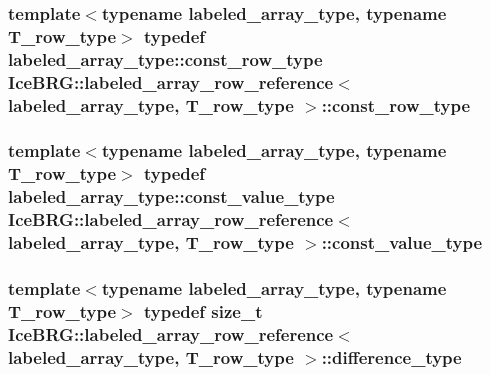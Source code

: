\subsubsection[{const\+\_\+row\+\_\+type}]{\setlength{\rightskip}{0pt plus 5cm}template$<$typename labeled\+\_\+array\+\_\+type, typename T\+\_\+row\+\_\+type$>$ typedef labeled\+\_\+array\+\_\+type\+::const\+\_\+row\+\_\+type {\bf Ice\+B\+R\+G\+::labeled\+\_\+array\+\_\+row\+\_\+reference}$<$ labeled\+\_\+array\+\_\+type, T\+\_\+row\+\_\+type $>$\+::{\bf const\+\_\+row\+\_\+type}}\label{classIceBRG_1_1labeled__array__row__reference_a80b2a3ea3231a22bf8c493841ad8cf3a}
\hypertarget{classIceBRG_1_1labeled__array__row__reference_a3eaf76b7cd84107e68c41cd4fc056c39}{}
\subsubsection[{const\+\_\+value\+\_\+type}]{\setlength{\rightskip}{0pt plus 5cm}template$<$typename labeled\+\_\+array\+\_\+type, typename T\+\_\+row\+\_\+type$>$ typedef labeled\+\_\+array\+\_\+type\+::const\+\_\+value\+\_\+type {\bf Ice\+B\+R\+G\+::labeled\+\_\+array\+\_\+row\+\_\+reference}$<$ labeled\+\_\+array\+\_\+type, T\+\_\+row\+\_\+type $>$\+::{\bf const\+\_\+value\+\_\+type}}\label{classIceBRG_1_1labeled__array__row__reference_a3eaf76b7cd84107e68c41cd4fc056c39}
\hypertarget{classIceBRG_1_1labeled__array__row__reference_a3c4333001dfc05e470766b9c2786f630}{}
\subsubsection[{difference\+\_\+type}]{\setlength{\rightskip}{0pt plus 5cm}template$<$typename labeled\+\_\+array\+\_\+type, typename T\+\_\+row\+\_\+type$>$ typedef size\+\_\+t {\bf Ice\+B\+R\+G\+::labeled\+\_\+array\+\_\+row\+\_\+reference}$<$ labeled\+\_\+array\+\_\+type, T\+\_\+row\+\_\+type $>$\+::{\bf difference\+\_\+type}}\label{classIceBRG_1_1labeled__array__row__reference_a3c4333001dfc05e470766b9c2786f630}
\hypertarget{classIceBRG_1_1labeled__array__row__reference_a6019a8a167f6816b145f39478b2fb691}{}
